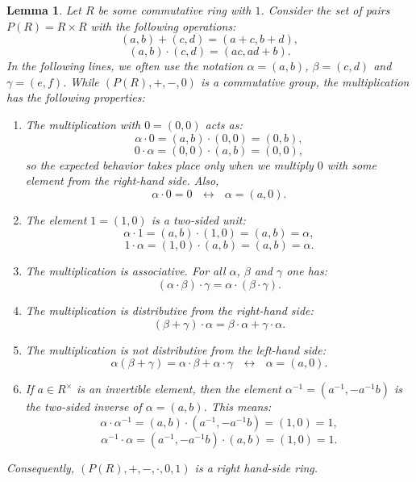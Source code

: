 \documentclass{article}
\theoremstyle{plain}
\newtheorem{lemma}{Lemma}[section]
\theoremstyle{definition}
\begin{document}
\begin{lemma}
    Let $R$ be some commutative ring with $1$. Consider the set of pairs $P(R) = R \times R$ with the following operations:
    $$(a,b) + (c,d) = (a+c, b+d),$$
    $$(a,b) \cdot (c,d) = (ac, ad+b).$$ 
    In the following lines, we often use the notation $\alpha = (a,b)$, $\beta = (c,d)$ and $\gamma = (e,f)$. 
    While $(P(R), +, -, 0)$ is a commutative group, the multiplication has the following properties: 
    \begin{enumerate}
        \item The multiplication with $0 = (0,0)$ acts as:
        $$\alpha \cdot 0 = (a,b) \cdot (0,0) = (0, b),$$
        $$0 \cdot \alpha = (0,0) \cdot (a,b) = (0,0),$$
        so the expected behavior takes place only when we multiply $0$ with some element from the right-hand side. Also, 
        $$\alpha \cdot 0 = 0 \,\,\,\,\longleftrightarrow \,\,\,\, \alpha = (a, 0). $$
        \item The element $1 = (1,0)$ is a two-sided unit:
        $$\alpha \cdot 1 = (a,b) \cdot (1,0) = (a, b) = \alpha,$$
        $$1 \cdot \alpha = (1,0) \cdot (a,b) = (a, b) = \alpha. $$
        \item The multiplication is associative. For all $\alpha$, $\beta$ and $\gamma$ one has:
        $$(\alpha \cdot \beta) \cdot \gamma = \alpha \cdot (\beta \cdot \gamma).$$  
        \item The multiplication is distributive from the right-hand side:
        $$(\beta + \gamma) \cdot \alpha = \beta \cdot \alpha + \gamma \cdot \alpha.$$
        \item The multiplication is not distributive from the left-hand side:
        $$\alpha(\beta + \gamma) = \alpha \cdot \beta + \alpha \cdot \gamma \,\,\,\, \longleftrightarrow \,\,\,\, \alpha = (a, 0). $$
        \item If $a \in R^\times$ is an invertible element, then the element $\alpha^{-1} = (a^{-1}, - a^{-1} b)$ is the two-sided inverse of $\alpha = (a, b)$. This means:
        $$\alpha \cdot \alpha^{-1} = (a,b) \cdot (a^{-1}, - a^{-1} b) = (1,0) = 1,$$
        $$\alpha^{-1} \cdot \alpha =  (a^{-1}, - a^{-1} b) \cdot (a,b) = (1,0) = 1.$$
        \end{enumerate}
        Consequently, $(P(R), +, -, \cdot,  0, 1)$ is a right hand-side ring. 
\end{lemma}
\end{document}
